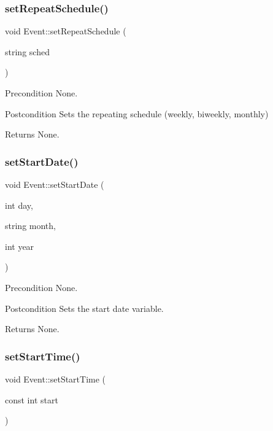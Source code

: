 \subsubsection{\texorpdfstring{set\+Repeat\+Schedule()}{setRepeatSchedule()}}
{\footnotesize\ttfamily void Event\+::set\+Repeat\+Schedule (\begin{DoxyParamCaption}\item[{string}]{sched }\end{DoxyParamCaption})}

\begin{DoxyPrecond}{Precondition}
None. 
\end{DoxyPrecond}
\begin{DoxyPostcond}{Postcondition}
Sets the repeating schedule (weekly, biweekly, monthly) 
\end{DoxyPostcond}
\begin{DoxyReturn}{Returns}
None. 
\end{DoxyReturn}
\hypertarget{class_event_a09934ab56dc05cd9f49c1962bd696b73}{}\label{class_event_a09934ab56dc05cd9f49c1962bd696b73} 
\subsubsection{\texorpdfstring{set\+Start\+Date()}{setStartDate()}}
{\footnotesize\ttfamily void Event\+::set\+Start\+Date (\begin{DoxyParamCaption}\item[{int}]{day,  }\item[{string}]{month,  }\item[{int}]{year }\end{DoxyParamCaption})}

\begin{DoxyPrecond}{Precondition}
None. 
\end{DoxyPrecond}
\begin{DoxyPostcond}{Postcondition}
Sets the start date variable. 
\end{DoxyPostcond}
\begin{DoxyReturn}{Returns}
None. 
\end{DoxyReturn}
\hypertarget{class_event_adc4bf90c98819c1ea15c5a59dcc2e471}{}\label{class_event_adc4bf90c98819c1ea15c5a59dcc2e471} 
\subsubsection{\texorpdfstring{set\+Start\+Time()}{setStartTime()}}
{\footnotesize\ttfamily void Event\+::set\+Start\+Time (\begin{DoxyParamCaption}\item[{const int}]{start }\end{DoxyParamCaption})}

